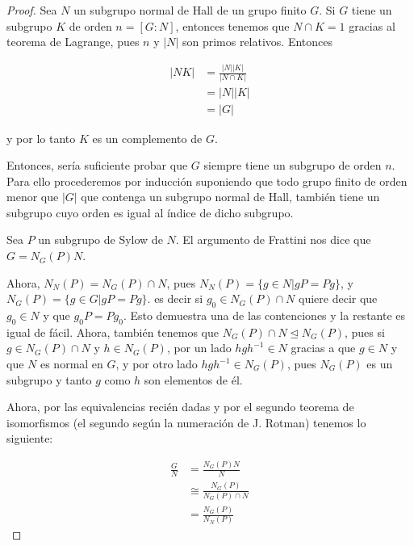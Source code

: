 \begin{proof}
    Sea $N$ un subgrupo normal de Hall de un grupo finito $G$. Si $G$ tiene un subgrupo $K$ de orden $n = [G:N]$, entonces
    tenemos que $N \cap K = 1$ gracias al teorema de Lagrange, pues $n$ y $|N|$ son primos relativos. Entonces
    
    \begin{align}
        |NK|    &= \frac{|N||K|}{|N \cap K|}    \\
                &= |N||K|                       \\
                &= |G| 
    \end{align}
    
    y por lo tanto $K$ es un complemento de $G$.\par\null
    
    Entonces, sería suficiente probar que $G$ siempre tiene un subgrupo de orden $n$. Para ello procederemos por inducción
    suponiendo que todo grupo finito de orden menor que $|G|$ que contenga un subgrupo normal de Hall, también
    tiene un subgrupo cuyo orden es igual al índice de dicho subgrupo.\par\null
    
    Sea $P$ un subgrupo de Sylow de $N$. El argumento de Frattini nos dice que $G = N_G(P)N$.\par\null
    
    Ahora, $N_N(P) = N_G(P) \cap N$, pues $N_N(P) = \{ g\in N | gP = Pg \}$, y $N_G(P) = \{ g\in G | gP = Pg \}$. es decir
    si $g_0 \in N_G(P) \cap N$ quiere decir que $g_0 \in N$ y que $g_0P = Pg_0$. Esto demuestra una de las contenciones y la
    restante es igual de fácil. Ahora,  también tenemos que $N_G(P) \cap N \trianglelefteq N_G(P)$, pues si $g \in N_G(P) \cap N$ y
    $h \in N_G(P)$, por un lado $hgh^{-1} \in N$ gracias a que $g \in N$ y que $N$ es normal en $G$, y por otro lado 
    $hgh^{-1} \in N_G(P)$, pues $N_G(P)$ es un subgrupo y tanto $g$ como $h$ son elementos de él.\par\null
    
    Ahora, por las equivalencias recién dadas y por el segundo teorema de isomorfismos 
    (el segundo según la numeración de J. Rotman) tenemos lo siguiente:
    
    \begin{align}
            \frac{G}{N}     &=      \frac{N_G(P)N}{N}               \\
                            &\cong  \frac{N_G(P)}{N_G(P) \cap N}    \\
                            &=      \frac{N_G(P)}{N_N(P)}
    \end{align}
\end{proof}
